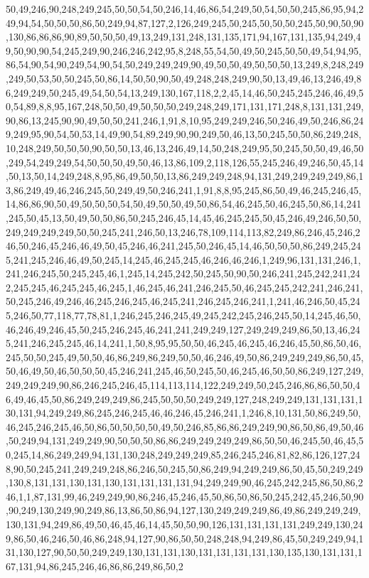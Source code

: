 50,49,246,90,248,249,245,50,50,54,50,246,14,46,86,54,249,50,54,50,50,245,86,95,94,249,94,54,50,50,50,86,50,249,94,87,127,2,126,249,245,50,245,50,50,50,245,50,90,50,90,130,86,86,86,90,89,50,50,50,49,13,249,131,248,131,135,171,94,167,131,135,94,249,49,50,90,90,54,245,249,90,246,246,242,95,8,248,55,54,50,49,50,245,50,50,49,54,94,95,86,54,90,54,90,249,54,90,54,50,249,249,249,90,49,50,50,49,50,50,50,13,249,8,248,249,249,50,53,50,50,245,50,86,14,50,50,90,50,49,248,248,249,90,50,13,49,46,13,246,49,86,249,249,50,245,49,54,50,54,13,249,130,167,118,2,2,45,14,46,50,245,245,246,46,49,50,54,89,8,8,95,167,248,50,50,49,50,50,50,249,248,249,171,131,171,248,8,131,131,249,90,86,13,245,90,90,49,50,50,241,246,1,91,8,10,95,249,249,246,50,246,49,50,246,86,249,249,95,90,54,50,53,14,49,90,54,89,249,90,90,249,50,46,13,50,245,50,50,86,249,248,10,248,249,50,50,50,90,50,50,13,46,13,246,49,14,50,248,249,95,50,245,50,50,49,46,50,249,54,249,249,54,50,50,50,49,50,46,13,86,109,2,118,126,55,245,246,49,246,50,45,14,50,13,50,14,249,248,8,95,86,49,50,50,13,86,249,249,248,94,131,249,249,249,249,86,13,86,249,49,46,246,245,50,249,49,50,246,241,1,91,8,8,95,245,86,50,49,46,245,246,45,14,86,86,90,50,49,50,50,50,54,50,49,50,50,49,50,86,54,46,245,50,46,245,50,86,14,241,245,50,45,13,50,49,50,50,86,50,245,246,45,14,45,46,245,245,50,45,246,49,246,50,50,249,249,249,249,50,50,245,241,246,50,13,246,78,109,114,113,82,249,86,246,45,246,246,50,246,45,246,46,49,50,45,246,46,241,245,50,246,45,14,46,50,50,50,86,249,245,245,241,245,246,46,49,50,245,14,245,46,245,245,46,246,46,246,1,249,96,131,131,246,1,241,246,245,50,245,245,46,1,245,14,245,242,50,245,50,90,50,246,241,245,242,241,242,245,245,46,245,245,46,245,1,46,245,46,241,246,245,50,46,245,245,242,241,246,241,50,245,246,49,246,46,245,246,245,46,245,241,246,245,246,241,1,241,46,246,50,45,245,246,50,77,118,77,78,81,1,246,245,246,245,49,245,242,245,246,245,50,14,245,46,50,46,246,49,246,45,50,245,246,245,46,241,241,249,249,127,249,249,249,86,50,13,46,245,241,246,245,245,46,14,241,1,50,8,95,95,50,50,46,245,46,245,46,246,45,50,86,50,46,245,50,50,245,49,50,50,46,86,249,86,249,50,50,46,246,49,50,86,249,249,249,86,50,45,50,46,49,50,46,50,50,50,45,246,241,245,46,50,245,50,46,245,46,50,50,86,249,127,249,249,249,249,90,86,246,245,246,45,114,113,114,122,249,249,50,245,246,86,86,50,50,46,49,46,45,50,86,249,249,249,86,245,50,50,50,249,249,127,248,249,249,131,131,131,130,131,94,249,249,86,245,246,245,46,46,246,45,246,241,1,246,8,10,131,50,86,249,50,46,245,246,245,46,50,86,50,50,50,50,49,50,246,85,86,86,249,249,90,86,50,86,49,50,46,50,249,94,131,249,249,90,50,50,50,86,86,249,249,249,249,86,50,50,46,245,50,46,45,50,245,14,86,249,249,94,131,130,248,249,249,249,85,246,245,246,81,82,86,126,127,248,90,50,245,241,249,249,248,86,246,50,245,50,86,249,94,249,249,86,50,45,50,249,249,130,8,131,131,130,131,130,131,131,131,131,94,249,249,90,46,245,242,245,86,50,86,246,1,1,87,131,99,46,249,249,90,86,246,45,246,45,50,86,50,86,50,245,242,45,246,50,90,90,249,130,249,90,249,86,13,86,50,86,94,127,130,249,249,249,86,49,86,249,249,249,130,131,94,249,86,49,50,46,45,46,14,45,50,50,90,126,131,131,131,131,249,249,130,249,86,50,46,246,50,46,86,248,94,127,90,86,50,50,248,248,94,249,86,45,50,249,249,94,131,130,127,90,50,50,249,249,130,131,131,130,131,131,131,131,130,135,130,131,131,167,131,94,86,245,246,46,86,86,249,86,50,2